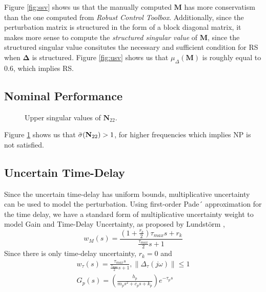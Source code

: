 Figure \ref{fig:ssv} shows us that the manually computed $\mathbf{M}$ has more conservatism than the one computed from \emph{Robust Control Toolbox}. Additionally, since the perturbation matrix is structured in the form of a block diagonal matrix, it makes more sense to compute the \emph{structured singular value} of $\mathbf{M}$, since the structured singular value consitutes the necessary and sufficient condition for RS when $\mathbf{\Delta}$ is structured.
Figure \ref{fig:usv} shows us that $\mu_\Delta(\mathbf{M})$ is roughly equal to $0.6$, which implies RS.

\subsection{Nominal Performance}
\begin{figure}[h!]
    \centering
    \scalebox{0.7}{
    \begin{tikzpicture}
        
    \end{tikzpicture}}
    \caption{Upper singular values of $\mathbf{N}_{22}$.}
    \label{fig:np}
\end{figure}
Figure \ref{fig:np} shows us that $\Bar{\sigma}(\mathbf{N}_{22}) > 1$, for higher frequencies which implies NP is not satisfied.

\subsection{Uncertain Time-Delay}
Since the uncertain time-delay has uniform bounds, multiplicative uncertainty can be used to model the perturbation. Using first-order Pade´ approximation for the time delay, we have a standard form of multiplicative uncertainty weight to model Gain and Time-Delay Uncertainty, as proposed by Lundstörm \cite{Sko05},
$$w_M(s) = \frac{\left(1 + \frac{r_k}{2}\right)\tau_{max}s + r_k}{\frac{\tau_{max}}{2}s + 1}$$
Since there is only time-delay uncertainty, $r_k = 0$ and
\begin{align*}
    w_\tau(s) = \frac{\tau_{max}s}{\frac{\tau_{max}}{2}s + 1}, \|\Delta_\tau(j\omega)\| \le 1\\
    G_p(s) = \left(\frac{h_p}{m_ps^2 + c_ps + k_p}\right)e^{-\tau_ps}
\end{align*}

